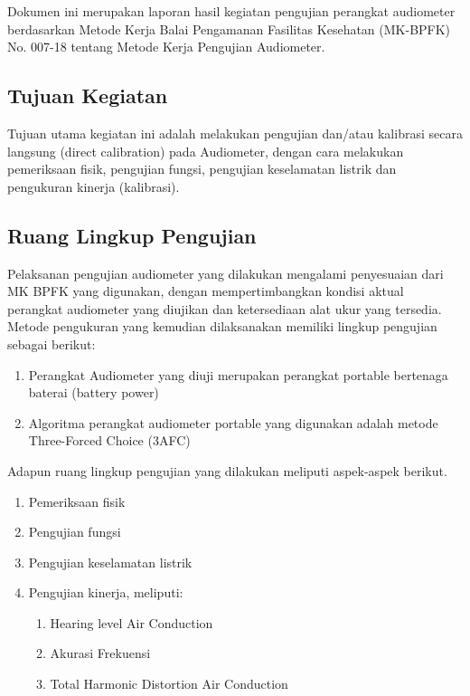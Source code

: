 \documentclass{article}
\begin{document}
	Dokumen ini merupakan laporan hasil kegiatan pengujian perangkat audiometer berdasarkan Metode Kerja Balai Pengamanan Fasilitas Kesehatan (MK-BPFK) No. 007-18 tentang Metode Kerja Pengujian Audiometer.  

	\subsection{Tujuan Kegiatan}

	Tujuan utama kegiatan ini adalah melakukan pengujian dan/atau kalibrasi secara langsung (direct calibration) pada
	Audiometer, dengan cara melakukan pemeriksaan fisik, pengujian fungsi, pengujian keselamatan listrik dan pengukuran
	kinerja (kalibrasi).
	
	\subsection{Ruang Lingkup Pengujian}
	
	Pelaksanan pengujian audiometer yang dilakukan mengalami penyesuaian dari MK BPFK yang digunakan, dengan mempertimbangkan kondisi aktual perangkat audiometer yang diujikan dan ketersediaan alat ukur yang tersedia. Metode pengukuran yang kemudian dilaksanakan memiliki lingkup pengujian sebagai berikut:
	\begin{enumerate}
		\item Perangkat Audiometer yang diuji merupakan perangkat portable bertenaga baterai (battery power)
		
		\item  Algoritma perangkat audiometer portable yang digunakan adalah metode Three-Forced Choice (3AFC)
	\end{enumerate}

	Adapun ruang lingkup pengujian yang dilakukan meliputi aspek-aspek berikut.
	\begin{enumerate}
		\item Pemeriksaan fisik
		
		\item Pengujian fungsi
		
		\item Pengujian keselamatan listrik
		
		\item Pengujian kinerja, meliputi:
		\begin{enumerate}
			\item Hearing level Air Conduction
			
			\item Akurasi Frekuensi
			
			\item Total Harmonic Distortion Air Conduction
		\end{enumerate}
		
	\end{enumerate}
\end{document}

